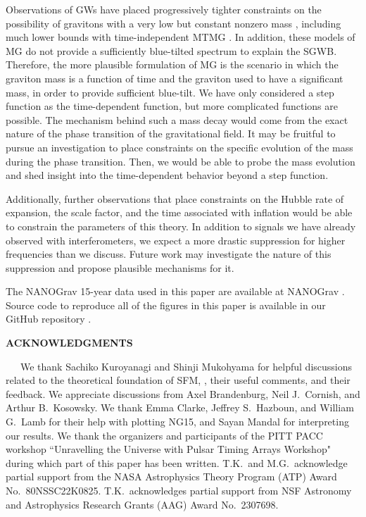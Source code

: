 \documentclass[prd,twocolumn,aps,psfig,nofootinbib,nobibnotes,superscriptaddress,preprintnumbers,times]{revtex4-2}
\begin{document}
Observations of GWs have placed progressively tighter constraints on the possibility of gravitons with a very low but constant nonzero mass \cite{Bernardo:2023mxc, Wu:2023rib, Wang:2023div, deRham:2016nuf}, including much lower bounds with time-independent MTMG \cite{DeFelice:2021trp,DeFelice:2023bwq}. In addition, these models of MG do not provide a sufficiently blue-tilted spectrum to explain the SGWB. Therefore, the more plausible formulation of MG is the scenario in which the graviton mass is a function of time and the graviton used to have a significant mass, in order to provide sufficient blue-tilt. We have only considered a step function as the time-dependent function, but more complicated functions are possible. The mechanism behind such a mass decay would come from the exact nature of the phase transition of the gravitational field. It may be fruitful to pursue an investigation to place constraints on the specific evolution of the mass during the phase transition. Then, we would be able to probe the mass evolution and shed insight into the time-dependent behavior beyond a step function.

Additionally, further observations that place constraints on the Hubble rate of expansion, the scale factor, and the time associated with inflation would be able to constrain the parameters of this theory. In addition to signals we have already observed with interferometers, we expect a more drastic suppression for higher frequencies than we discuss. Future work may investigate the nature of this suppression and propose plausible mechanisms for it.

\vspace{3mm}
The NANOGrav 15-year data used in this paper are available at NANOGrav \cite{NANOGrav:2023}. Source code to reproduce all of the figures in this paper is available in our GitHub repository \cite{Choi:2024}. 

\begin{center}
    \textbf{ACKNOWLEDGMENTS}    
\end{center}
\ \ \ We thank Sachiko Kuroyanagi and Shinji Mukohyama for helpful discussions related to the theoretical foundation of SFM, \cite{Fujita:2018ehq}, their useful comments, and their feedback. We appreciate discussions from Axel Brandenburg, Neil J.\ Cornish, and Arthur B.\ Kosowsky. We thank Emma Clarke, Jeffrey S.\ Hazboun, and William G.\ Lamb for their help with plotting NG15, and Sayan Mandal for interpreting our results. We thank the organizers and participants of the PITT PACC workshop ``Unravelling the Universe with Pulsar Timing Arrays Workshop" during which part of this paper has been written. T.K.\ and M.G.\ acknowledge partial support from the NASA Astrophysics Theory Program (ATP) Award No.\ 80NSSC22K0825. T.K.\ acknowledges partial support from NSF Astronomy and Astrophysics Research Grants (AAG) Award No.\ 2307698.




\clearpage
\end{document}
